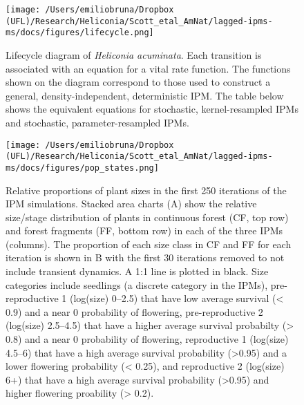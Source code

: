 \documentclass[
  12pt,
]{article}
\begin{document}
\newpage

\begin{figure}

{\centering \texttt{[image: /Users/emiliobruna/Dropbox (UFL)/Research/Heliconia/Scott\_etal\_AmNat/lagged-ipms-ms/docs/figures/lifecycle.png]}

}

\caption{\label{fig-lifecycle}Lifecycle diagram of \emph{Heliconia
acuminata}. Each transition is associated with an equation for a vital
rate function. The functions shown on the diagram correspond to those
used to construct a general, density-independent, deterministic IPM. The
table below shows the equivalent equations for stochastic,
kernel-resampled IPMs and stochastic, parameter-resampled IPMs.}

\end{figure}

\newpage

\begin{figure}

{\centering \texttt{[image: /Users/emiliobruna/Dropbox (UFL)/Research/Heliconia/Scott\_etal\_AmNat/lagged-ipms-ms/docs/figures/pop\_states.png]}

}

\caption{\label{fig-pop-states}Relative proportions of plant sizes in
the first 250 iterations of the IPM simulations. Stacked area charts (A)
show the relative size/stage distribution of plants in continuous forest
(CF, top row) and forest fragments (FF, bottom row) in each of the three
IPMs (columns). The proportion of each size class in CF and FF for each
iteration is shown in B with the first 30 iterations removed to not
include transient dynamics. A 1:1 line is plotted in black. Size
categories include seedlings (a discrete category in the IPMs),
pre-reproductive 1 (log(size) 0--2.5) that have low average survival
(\textless{} 0.9) and a near 0 probability of flowering,
pre-reproductive 2 (log(size) 2.5--4.5) that have a higher average
survival probabilty (\textgreater{} 0.8) and a near 0 probability of
flowering, reproductive 1 (log(size) 4.5--6) that have a high average
survival probability (\textgreater0.95) and a lower flowering
probability (\textless{} 0.25), and reproductive 2 (log(size) 6+) that
have a high average survival probability (\textgreater0.95) and higher
flowering proability (\textgreater{} 0.2).}

\end{figure}
\end{document}
